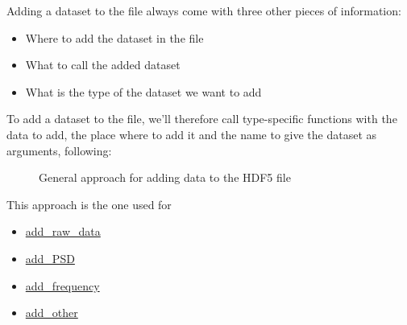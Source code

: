 
Adding a dataset to the file always come with three other pieces of information:
\begin{itemize}
    \item Where to add the dataset in the file
    \item What to call the added dataset
    \item What is the type of the dataset we want to add
\end{itemize}

To add a dataset to the file, we'll therefore call type-specific functions with the data to add, the place where to add it and the name to give the dataset as arguments, following:

\begin{figure}[H]
    \centering
    \label{fig:wrapper.flowchart_add_functions}
    \small
    \caption{General approach for adding data to the HDF5 file}
\end{figure}

This approach is the one used for
\begin{itemize}
    \item \hyperref[subchapter:wrapper.add_raw_data]{add\_raw\_data}
    \item \hyperref[subchapter:wrapper.add_psd]{add\_PSD}
    \item \hyperref[subchapter:wrapper.add_frequency]{add\_frequency}
    \item \hyperref[subchapter:wrapper.add_other]{add\_other}
\end{itemize}

